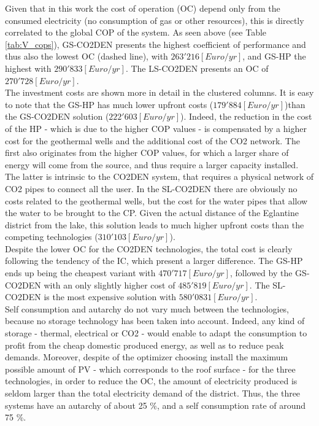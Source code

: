 \documentclass{article}
\begin{document}
Given that in this work the cost of operation (OC) depend only from the consumed electricity (no consumption of gas or other resources), this is directly correlated to the global COP of the system. As seen above (see Table \ref{tab:V_cops}), GS-CO2DEN presents the highest coefficient of performance and thus also the lowest OC (dashed line), with $263'216[Euro/yr]$, and GS-HP the highest with $290'833[Euro/yr]$. The LS-CO2DEN presents an OC of $270'728[Euro/yr]$.\\

The investment costs are shown more in detail in the clustered columns. It is easy to note that the GS-HP has much lower upfront costs ($179'884[Euro/yr]$)than the GS-CO2DEN solution ($222'603[Euro/yr]$). Indeed, the reduction in the cost of the HP - which is due to the higher COP values - is compensated by a higher cost for the geothermal wells and the additional cost of the CO2 network. The first also originates from the higher COP values, for which a larger share of energy will come from the source, and thus require a larger capacity installed. The latter is intrinsic to the CO2DEN system, that requires a physical network of CO2 pipes to connect all the user. In the SL-CO2DEN there are obviously no costs related to the geothermal wells, but the cost for the water pipes that allow the water to be brought to the CP. Given the actual distance of the Eglantine district from the lake, this solution leads to much higher upfront costs than the competing technologies ($310'103[Euro/yr]$).\\

Despite the lower OC for the CO2DEN technologies, the total cost is clearly following the tendency of the IC, which present a larger difference. The GS-HP ends up being the cheapest variant with $470'717 [Euro/yr]$, followed by the GS-CO2DEN with an only slightly higher cost of $485'819 [Euro/yr]$. The SL-CO2DEN is the most expensive solution with $580'0831 [Euro/yr]$.\\

Self consumption and autarchy do not vary much between the technologies, because no storage technology has been taken into account. Indeed, any kind of storage - thermal, electrical or CO2 - would enable to adapt the consumption to profit from the cheap domestic produced energy, as well as to reduce peak demands. Moreover, despite of the optimizer choosing install the maximum possible amount of PV - which corresponds to the roof surface - for the three technologies, in order to reduce the OC, the amount of electricity produced is seldom larger than the total electricity demand of the district. Thus, the three systems have an autarchy of about 25 \%, and a self consumption rate of around 75 \%.
\end{document}
